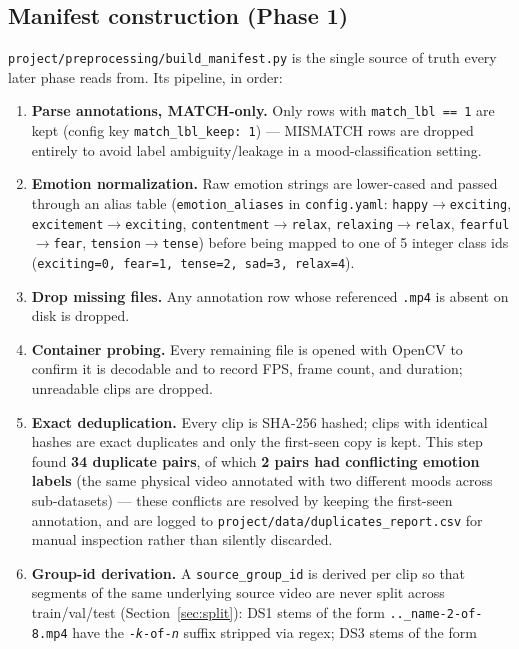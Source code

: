 \documentclass[11pt]{article}
\begin{document}
\subsection{Manifest construction (Phase 1)}
\label{sec:manifest}
\texttt{project/preprocessing/build\_manifest.py} is the single source of truth every later phase
reads from. Its pipeline, in order:
\begin{enumerate}
  \item \textbf{Parse annotations, MATCH-only.} Only rows with \texttt{match\_lbl == 1} are kept
  (config key \texttt{match\_lbl\_keep: 1}) --- MISMATCH rows are dropped entirely to avoid label
  ambiguity/leakage in a mood-classification setting.
  \item \textbf{Emotion normalization.} Raw emotion strings are lower-cased and passed through an
  alias table (\texttt{emotion\_aliases} in \texttt{config.yaml}: \texttt{happy}$\to$\texttt{exciting},
  \texttt{excitement}$\to$\texttt{exciting}, \texttt{contentment}$\to$\texttt{relax},
  \texttt{relaxing}$\to$\texttt{relax}, \texttt{fearful}$\to$\texttt{fear},
  \texttt{tension}$\to$\texttt{tense}) before being mapped to one of 5 integer class ids
  (\texttt{exciting=0, fear=1, tense=2, sad=3, relax=4}).
  \item \textbf{Drop missing files.} Any annotation row whose referenced \texttt{.mp4} is absent on
  disk is dropped.
  \item \textbf{Container probing.} Every remaining file is opened with OpenCV to confirm it is
  decodable and to record FPS, frame count, and duration; unreadable clips are dropped.
  \item \textbf{Exact deduplication.} Every clip is SHA-256 hashed; clips with identical hashes are
  exact duplicates and only the first-seen copy is kept. This step found \textbf{34 duplicate
  pairs}, of which \textbf{2 pairs had conflicting emotion labels} (the same physical video
  annotated with two different moods across sub-datasets) --- these conflicts are resolved by
  keeping the first-seen annotation, and are logged to
  \texttt{project/data/duplicates\_report.csv} for manual inspection rather than silently
  discarded.
  \item \textbf{Group-id derivation.} A \texttt{source\_group\_id} is derived per clip so that
  segments of the same underlying source video are never split across train/val/test
  (Section~\ref{sec:split}): DS1 stems of the form \texttt{..\_name-2-of-8.mp4} have the
  \texttt{-\textit{k}-of-\textit{n}} suffix stripped via regex; DS3 stems of the form

\end{enumerate}
\end{document}
